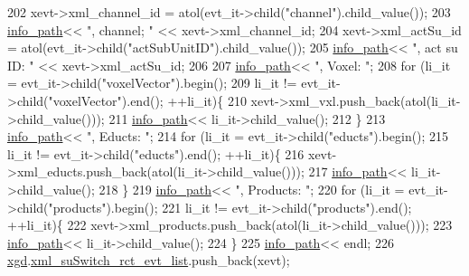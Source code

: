 \begin{DoxyCode}
202         xevt->xml\_channel\_id = atol(evt\_it->child(\textcolor{stringliteral}{"channel"}).child\_value());
203         \hyperlink{classnw_1_1_standard___ipt_a7b8147e8b90f4adabb30e1b3fd8c40b8}{info\_path}<< \textcolor{stringliteral}{", channel; "} << xevt->xml\_channel\_id;
204         xevt->xml\_actSu\_id = atol(evt\_it->child(\textcolor{stringliteral}{"actSubUnitID"}).child\_value());
205         \hyperlink{classnw_1_1_standard___ipt_a7b8147e8b90f4adabb30e1b3fd8c40b8}{info\_path}<< \textcolor{stringliteral}{", act su ID: "} << xevt->xml\_actSu\_id;
206 
207         \hyperlink{classnw_1_1_standard___ipt_a7b8147e8b90f4adabb30e1b3fd8c40b8}{info\_path}<< \textcolor{stringliteral}{", Voxel: "};
208         \textcolor{keywordflow}{for} (li\_it = evt\_it->child(\textcolor{stringliteral}{"voxelVector"}).begin();
209                 li\_it != evt\_it->child(\textcolor{stringliteral}{"voxelVector"}).end(); ++li\_it)\{
210             xevt->xml\_vxl.push\_back(atol(li\_it->child\_value()));
211             \hyperlink{classnw_1_1_standard___ipt_a7b8147e8b90f4adabb30e1b3fd8c40b8}{info\_path}<< li\_it->child\_value();
212         \}
213         \hyperlink{classnw_1_1_standard___ipt_a7b8147e8b90f4adabb30e1b3fd8c40b8}{info\_path}<< \textcolor{stringliteral}{", Educts: "};
214         \textcolor{keywordflow}{for} (li\_it = evt\_it->child(\textcolor{stringliteral}{"educts"}).begin();
215                 li\_it != evt\_it->child(\textcolor{stringliteral}{"educts"}).end(); ++li\_it)\{
216             xevt->xml\_educts.push\_back(atol(li\_it->child\_value()));
217             \hyperlink{classnw_1_1_standard___ipt_a7b8147e8b90f4adabb30e1b3fd8c40b8}{info\_path}<< li\_it->child\_value();
218         \}
219         \hyperlink{classnw_1_1_standard___ipt_a7b8147e8b90f4adabb30e1b3fd8c40b8}{info\_path}<< \textcolor{stringliteral}{", Products: "};
220         \textcolor{keywordflow}{for} (li\_it = evt\_it->child(\textcolor{stringliteral}{"products"}).begin();
221                 li\_it != evt\_it->child(\textcolor{stringliteral}{"products"}).end(); ++li\_it)\{
222             xevt->xml\_products.push\_back(atol(li\_it->child\_value()));
223             \hyperlink{classnw_1_1_standard___ipt_a7b8147e8b90f4adabb30e1b3fd8c40b8}{info\_path}<< li\_it->child\_value();
224         \}
225         \hyperlink{classnw_1_1_standard___ipt_a7b8147e8b90f4adabb30e1b3fd8c40b8}{info\_path}<< endl;
226         \hyperlink{classnw_1_1_standard___ipt_aad5708d9729b7a5f660dade1927b4d4e}{xgd}.\hyperlink{structnw_1_1_standard___ipt_1_1xml__gen__data_a4da34a5918c4e045ed5021da6fdbc6bf}{xml\_suSwitch\_rct\_evt\_list}.push\_back(xevt);

\end{DoxyCode}
